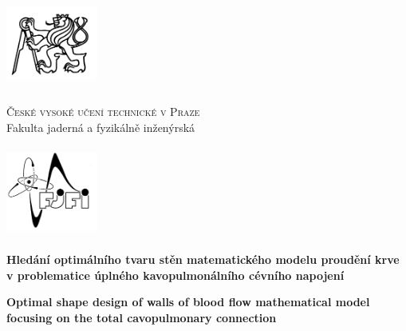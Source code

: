 \def\documentdate{21. kv\v{e}tna 2023}


\pagestyle{empty}
{\centering

\noindent %
\begin{minipage}[c]{3cm}%
\noindent \begin{center}
\includegraphics[width=3cm,height=3cm,keepaspectratio]{figures/TITLE/cvut}
\par\end{center}%
\end{minipage}%
\begin{minipage}[c]{0.6\linewidth}%
\begin{center}
\textsc{\large{}České vysoké učení technické v Praze}{\large{}}\\
{\large{}Fakulta jaderná a fyzikálně inženýrská}
\par\end{center}%
\end{minipage}%
\begin{minipage}[c]{3cm}%
\noindent \begin{center}
\includegraphics[width=3cm,height=3cm,keepaspectratio]{figures/TITLE/fjfi}
\par\end{center}%
\end{minipage}

\vspace{3cm}

\textbf{\huge{}Hledání optimálního tvaru stěn matematického modelu proudění krve v problematice úplného kavopulmonálního cévního napojení}{\huge\par}

\vspace{1cm}

%
\textbf{\huge{}Optimal shape design of walls of blood flow mathematical model focusing on the total cavopulmonary connection}{\huge\par}

}
